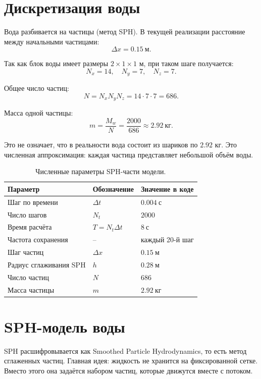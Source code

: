 \documentclass[12pt,a4paper]{article}
\begin{document}
\section{Дискретизация воды}

Вода разбивается на частицы (метод SPH). В текущей реализации расстояние между начальными
частицами:
\[
\Delta x = 0.15 \ \text{м}.
\]

Так как блок воды имеет размеры \(2 \times 1 \times 1\) м, при таком шаге
получается:
\[
N_x = 14, \quad N_y = 7, \quad N_z = 7.
\]

Общее число частиц:
\[
N = N_xN_yN_z
= 14 \cdot 7 \cdot 7
= 686.
\]

Масса одной частицы:
\[
m = \frac{M_w}{N}
=
\frac{2000}{686}
\approx 2.92 \ \text{кг}.
\]

Это не означает, что в реальности вода состоит из шариков по \(2.92\) кг.
Это численная аппроксимация: каждая частица представляет небольшой объём воды.

\begin{table}[h]
\centering
\begin{tabular}{lll}
\toprule
Параметр & Обозначение & Значение в коде \\
\midrule
Шаг по времени & \(\Delta t\) & \(0.004 \ \text{с}\) \\
Число шагов & \(N_t\) & \(2000\) \\
Время расчёта & \(T=N_t\Delta t\) & \(8 \ \text{с}\) \\
Частота сохранения & -- & каждый 20-й шаг \\
Шаг частиц & \(\Delta x\) & \(0.15 \ \text{м}\) \\
Радиус сглаживания SPH & \(h\) & \(0.28 \ \text{м}\) \\
Число частиц & \(N\) & \(686\) \\
Масса частицы & \(m\) & \(2.92 \ \text{кг}\) \\
\bottomrule
\end{tabular}
\caption{Численные параметры SPH-части модели.}
\end{table}

\section{SPH-модель воды}

SPH расшифровывается как Smoothed Particle Hydrodynamics, то есть метод
сглаженных частиц. Главная идея: жидкость не хранится на фиксированной сетке.
Вместо этого она задаётся набором частиц, которые движутся вместе с потоком.
\end{document}
